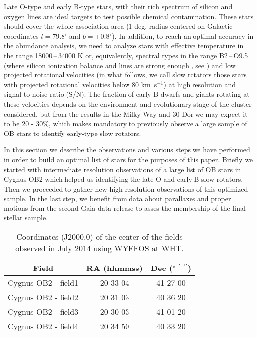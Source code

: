 \documentclass{aa} %
\begin{document}
Late O-type and early B-type stars, with their rich spectrum of silicon and oxygen lines are ideal targets to test possible chemical contamination. These stars should cover the whole association area (1 deg. radius centered on Galactic coordinates $l = $79.8$^{\circ}$ and $b = $+0.8$^{\circ}$).
In addition, to reach an optimal accuracy in the abundance analysis, we need to analyze stars with effective temperature in the range 18000\,--\,34000 K  or, equivalently, spectral types in the range B2\,--\,O9.5 (where silicon ionization balance and  lines are strong enough , see \cite{ssimon10}) and low projected rotational velocities (in what follows, we call slow rotators those stars with projected rotational velocities below 80 km~s$^{-1}$) at high resolution and signal-to-noise ratio (S/N). The fraction of early-B dwarfs and giants rotating at these velocities depends on the environment and evolutionary stage of the cluster considered, but from the results in the Milky Way \citep{dufton06, wolff07, huang06} and 30 Dor \citep{dufton13} we may expect it to be 20 - 30$\%$, which makes mandatory to previously observe a large sample of OB stars to identify early-type slow rotators.


In this section we describe the observations and various steps we have performed in order to build an optimal list of stars for the purposes of this paper. Briefly we started with intermediate resolution observations of a large list of OB stars in Cygnus OB2 which helped us  identifying the late-O and early-B slow rotators. Then we proceeded to gather new high-resolution observations of this optimized sample. In the last step, we benefit from data about parallaxes and proper motions from the second Gaia data release \citep[Gaia DR2, ][]{gaia18} to asses the membership of the final stellar sample. 

  \begin{table}[t!]
	\centering
	\caption{Coordinates (J2000.0) of the center of the fields observed in July 2014 using WYFFOS at WHT.}
	\label{table1}
		\begin{tabular}{ccc}
		\hline 
		\hline 
   		 \small{Field}& \small{RA (hhmmss)}& \small{Dec ($^{\circ}$ $^\prime$ $^{\prime\prime}$)} \\
   		\hline 
      	\small{Cygnus OB2 - field1} & \small{20 33 04} & \small{41 27 00}\\
		\small{Cygnus OB2 - field2} & \small{20 31 03} & \small{40 36 20} \\
 		\small{Cygnus OB2 - field3} & \small{20 30 03} & \small{41 01 20} \\
 		\small{Cygnus OB2 - field4} & \small{20 34 50} & \small{40 33 20} \\
      	\hline
		\end{tabular}	
\end{table}  
\end{document}
